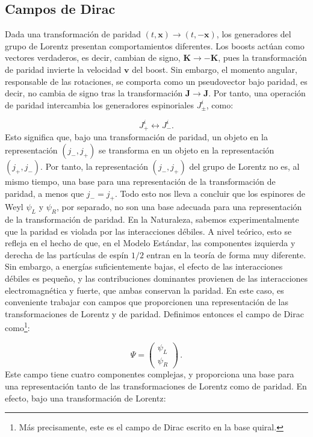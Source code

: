 \documentclass[a4paper,11pt]{book} %
\begin{document}
\subsection*{Campos de Dirac}
\noindent
Dada una transformación de paridad $(t,\mathbf{x})\rightarrow(t,-\mathbf{x})$, los generadores del grupo de Lorentz presentan comportamientos diferentes.
\medskip\newline
Los boosts actúan como
vectores verdaderos, es decir, cambian de signo, $\mathbf{K}\rightarrow-\mathbf{K}$, pues la transformación de paridad invierte la velocidad $\mathbf{v}$ del boost. Sin embargo, el momento angular, responsable de las rotaciones, se comporta como un pseudovector bajo paridad, es decir, no cambia de signo tras la transformación
$\mathbf{J}\rightarrow\mathbf{J}$. 
\medskip\newline
Por tanto, una operación de paridad
intercambia los generadores espinoriales $J^{i}_{\pm}$, como: 

$$J^{i}_{+}\leftrightarrow J^{i}_{-}.$$
\noindent
Esto significa que, bajo una transformación de paridad, un objeto en la
representación $(j_{-},j_{+})$ se transforma en un objeto en la representación
$(j_{+},j_{-})$. Por tanto, la representación $(j_{-},j_{+})$ del grupo de
Lorentz no es, al mismo tiempo, una base para una representación de la
transformación de paridad, a menos que $j_{-}=j_{+}$. 
\medskip\newline
Todo esto nos lleva a concluir que los espinores de Weyl $\psi_{L}$
y $\psi_{R}$, por separado, no son una base adecuada para una representación de la transformación de paridad. 
\medskip\newline
En la Naturaleza, sabemos experimentalmente que la paridad es violada por las
interacciones débiles. A nivel teórico, esto se refleja en el hecho de que, en el Modelo Estándar, las componentes izquierda y derecha de las partículas de
espín $1/2$ entran en la teoría de forma muy diferente. Sin embargo, a energías suficientemente bajas, el efecto de las interacciones débiles es pequeño, y las
contribuciones dominantes provienen de las interacciones electromagnética y
fuerte, que ambas conservan la paridad. En este caso, es conveniente trabajar
con campos que proporcionen una representación de las transformaciones de
Lorentz y de paridad. 
\medskip\newline
Definimos entonces el campo de Dirac
como\footnote{Más precisamente, este es el campo de Dirac escrito en la base
quiral.}:

\begin{equation}
\Psi=\begin{pmatrix}\psi_{L}\\ \psi_{R}\end{pmatrix}\,.
\end{equation}
\noindent
Este campo tiene cuatro componentes complejas, y proporciona
una base para una representación tanto de las transformaciones de Lorentz como
de paridad. En efecto, bajo una transformación de Lorentz:
\end{document}
